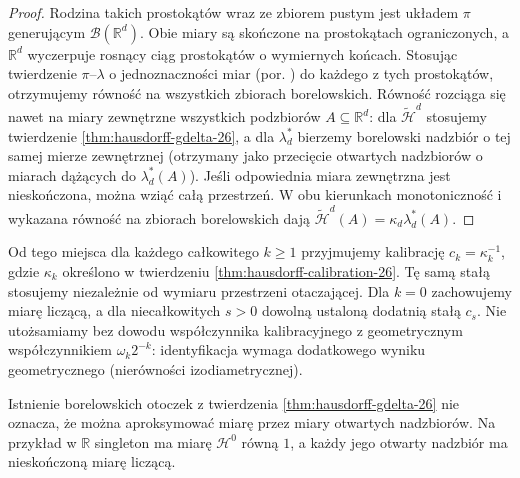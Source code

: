 \begin{proof}
Rodzina takich prostokątów wraz ze zbiorem pustym
jest układem $\pi$ generującym $\mathcal B(\mathbb R^d)$.
Obie miary są skończone na prostokątach ograniczonych,
a $\mathbb R^d$ wyczerpuje rosnący ciąg prostokątów
o wymiernych końcach. Stosując twierdzenie
$\pi$--$\lambda$ o jednoznaczności miar (por. ) do
każdego z tych prostokątów, otrzymujemy równość
na wszystkich zbiorach borelowskich.
Równość rozciąga się nawet na miary zewnętrzne wszystkich
podzbiorów $A\subseteq\mathbb R^d$:
dla $\widetilde{\mathcal H}^d$ stosujemy twierdzenie
\ref{thm:hausdorff-gdelta-26}, a dla $\lambda_d^*$
bierzemy borelowski nadzbiór o tej samej mierze zewnętrznej
(otrzymany jako przecięcie otwartych nadzbiorów
o miarach dążących do $\lambda_d^*(A)$).
Jeśli odpowiednia miara zewnętrzna jest nieskończona,
można wziąć całą przestrzeń. W obu kierunkach
monotoniczność i wykazana równość na zbiorach
borelowskich dają
$\widetilde{\mathcal H}^d(A)=\kappa_d\lambda_d^*(A)$.
\end{proof}

\begin{uwaga}
\label{rem:hausdorff-convention-26}
Od tego miejsca dla każdego całkowitego $k\ge1$
przyjmujemy kalibrację $c_k=\kappa_k^{-1}$,
gdzie $\kappa_k$ określono w twierdzeniu
\ref{thm:hausdorff-calibration-26}.
Tę samą stałą stosujemy niezależnie od wymiaru
przestrzeni otaczającej. Dla $k=0$ zachowujemy
miarę liczącą, a dla niecałkowitych $s>0$ dowolną
ustaloną dodatnią stałą $c_s$.
Nie utożsamiamy bez dowodu współczynnika kalibracyjnego
z geometrycznym współczynnikiem $\omega_k2^{-k}$:
identyfikacja wymaga dodatkowego wyniku geometrycznego
(nierówności izodiametrycznej).

Istnienie borelowskich otoczek z twierdzenia
\ref{thm:hausdorff-gdelta-26} nie oznacza, że można
aproksymować miarę przez miary otwartych nadzbiorów.
Na przykład w $\mathbb R$ singleton ma miarę
$\mathcal H^0$ równą $1$, a każdy jego otwarty
nadzbiór ma nieskończoną miarę liczącą.
\end{uwaga}

